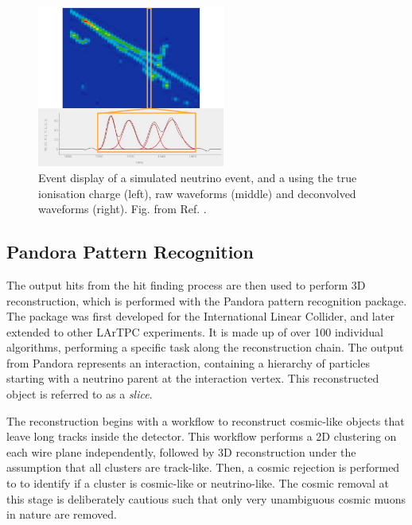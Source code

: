 \begin{figure}[htbp!] 
\centering    
\includegraphics[width=0.55\textwidth]{gaushit}
\caption[gaushit]{
Event display of a simulated neutrino event, and a using the true ionisation charge (left), raw waveforms (middle) and deconvolved waveforms (right).
Fig. from Ref. \cite{EdPhD}.
}
\label{fig:gaushit}
\end{figure}

\subsection{Pandora Pattern Recognition}

The output hits from the hit finding process are then used to perform 3D reconstruction, which is performed with the Pandora pattern recognition package\cite{pandora}. 
The package was first developed for the International Linear Collider, and later extended to other LArTPC experiments.
It is made up of over 100 individual algorithms, performing a specific task along the reconstruction chain.
The output from Pandora represents an interaction, containing a hierarchy of particles starting with a neutrino parent at the interaction vertex.
This reconstructed object is referred to as a \textit{slice}.  

The reconstruction begins with a workflow to reconstruct cosmic-like objects that leave long tracks inside the detector.
This workflow performs a 2D clustering on each wire plane independently, followed by 3D reconstruction under the assumption that all clusters are track-like.
Then, a cosmic rejection is performed to to identify if a cluster is cosmic-like or neutrino-like.
The cosmic removal at this stage is deliberately cautious such that only very unambiguous cosmic muons in nature are removed.


